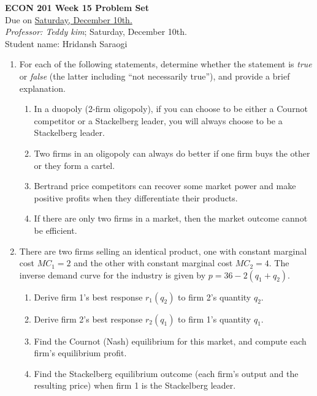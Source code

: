 \documentclass[11pt]{article}
\begin{document}
\begin{center}
\textbf{ECON 201 Week 15 Problem Set}\\
Due on \underline{Saturday, December 10th.}
\\
\textit {Professor: Teddy kim};  
Saturday, December 10th.
\\Student name: Hridansh Saraogi

\end{center}

\begin{enumerate}
\item For each of the following statements, determine whether
the statement is \emph{true} or \emph{false} (the latter including ``not necessarily true''), and provide a brief explanation.
    \begin{enumerate}
    \item In a duopoly (2-firm oligopoly), if you can choose to be either a Cournot competitor or a Stackelberg leader, you will always choose to be a Stackelberg leader.
	
	\item Two firms in an oligopoly can always do better if one firm buys the other or they form a cartel.
	
	\item Bertrand price competitors can recover some market power and make positive profits when they differentiate their products.
	
	\item If there are only two firms in a market, then the market outcome cannot be efficient.
	\end{enumerate}

\item There are two firms selling an identical product, one with constant marginal cost $MC_{1}=2$ and the other with constant marginal cost $MC_{2}=4$. The inverse demand curve for the industry is given by $p=36-2(q_{1}+q_{2})$.
    \begin{enumerate}
        \item Derive firm 1's best response $r_{1}(q_{2})$ to firm 2's quantity $q_{2}$.

        \item Derive firm 2's best response $r_{2}(q_{1})$ to firm 1's quantity $q_{1}$.

        \item Find the Cournot (Nash) equilibrium for this market, and compute each firm's equilibrium profit.

        \item Find the Stackelberg equilibrium outcome (each firm's output and the resulting price) when firm 1 is the Stackelberg leader.


\end{enumerate}
\end{enumerate}
\end{document}
